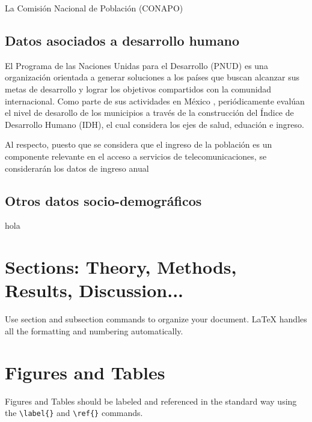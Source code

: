 \documentclass[9pt,twocolumn,twoside]{ilcss}
\begin{document}
La Comisión Nacional de Población (CONAPO)

\subsection{Datos asociados a desarrollo humano}

El Programa de las Naciones Unidas para el Desarrollo (PNUD) es una organización orientada a generar soluciones a los países que buscan alcanzar sus metas de desarrollo y lograr los objetivos compartidos con la comunidad internacional. Como parte de sus actividades en México \cite{ONU2015}, periódicamente evalúan el nivel de desarollo de los municipios a través de la construcción del Índice de Desarrollo Humano (IDH), el cual considera los ejes de salud, eduación e ingreso.

Al respecto, puesto que se considera que el ingreso de la población es un componente relevante en el acceso a servicios de telecomunicaciones, se considerarán los datos de ingreso anual 

\subsection{Otros datos socio-demográficos}

hola


\section*{Sections: Theory, Methods, Results, Discussion...}

Use section and subsection commands to organize your document. \LaTeX{} handles all the formatting and numbering automatically. 

\section{Figures and Tables}

Figures and Tables should be labeled and referenced in the standard way using the \verb|\label{}| and \verb|\ref{}| commands.
\end{document}
